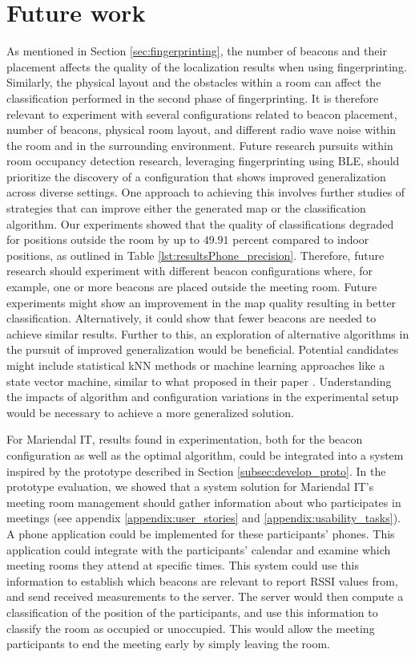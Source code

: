 \chapter{Future work}
As mentioned in Section \ref{sec:fingerprinting}, the number of beacons and their placement affects the quality of the localization results when using fingerprinting. 
Similarly, the physical layout and the obstacles within a room can affect the classification performed in the second phase of fingerprinting. 
It is therefore relevant to experiment with several configurations related to beacon placement, number of beacons, physical room layout, and different radio wave noise within the room and in the surrounding environment. 
Future research pursuits within room occupancy detection research, leveraging fingerprinting using BLE, should prioritize the discovery of a configuration that shows improved generalization across diverse settings. 
One approach to achieving this involves further studies of strategies that can improve either the generated map or the classification algorithm.
Our experiments showed that the quality of classifications degraded for positions outside the room by up to $49.91$ percent compared to indoor positions, as outlined in Table \ref{lst:resultsPhone_precision}. Therefore, future research should experiment with different beacon configurations where, for example, one or more beacons are placed outside the meeting room. 
Future experiments might show an improvement in the map quality resulting in better classification. Alternatively, it could show that fewer beacons are needed to achieve similar results. 
Further to this, an exploration of alternative algorithms in the pursuit of improved generalization would be beneficial.
Potential candidates might include statistical kNN methods or machine learning approaches like a state vector machine, similar to what \citeauthor{ble_kneares_neural} proposed in their paper \cite{ble_kneares_neural}. 
Understanding the impacts of algorithm and configuration variations in the experimental setup would be necessary to achieve a more generalized solution.

For Mariendal IT, results found in experimentation, both for the beacon configuration as well as the optimal algorithm, could be integrated into a system inspired by the prototype described in Section \ref{subsec:develop_proto}. 
In the prototype evaluation, we showed that a system solution for Mariendal IT's meeting room management should gather information about who participates in meetings (see appendix \ref{appendix:user_stories} and \ref{appendix:usability_tasks}). 
A phone application could be implemented for these participants' phones. 
This application could integrate with the participants' calendar and examine which meeting rooms they attend at specific times.
This system could use this information to establish which beacons are relevant to report RSSI values from, and send received measurements to the server. 
The server would then compute a classification of the position of the participants, and use this information to classify the room as occupied or unoccupied. 
This would allow the meeting participants to end the meeting early by simply leaving the room.

